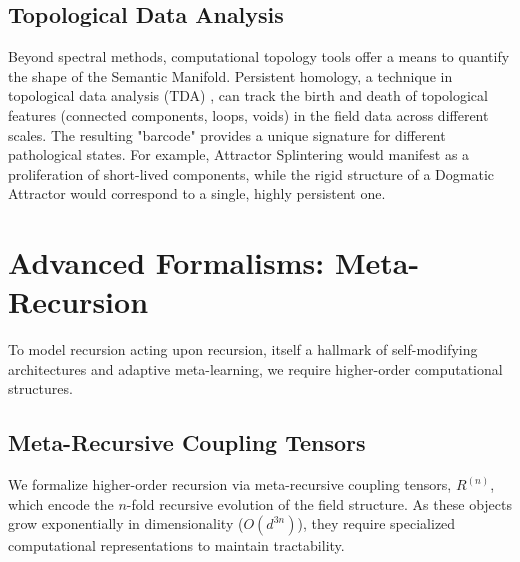 \subsection{Topological Data Analysis}

Beyond spectral methods, computational topology tools offer a means to quantify the shape of the Semantic Manifold. Persistent homology, a technique in topological data analysis (TDA) \autocite{EdelsbrunnerHarer2010}, can track the birth and death of topological features (connected components, loops, voids) in the field data across different scales. The resulting "barcode" provides a unique signature for different pathological states. For example, Attractor Splintering would manifest as a proliferation of short-lived components, while the rigid structure of a Dogmatic Attractor would correspond to a single, highly persistent one.

\section{Advanced Formalisms: Meta-Recursion}
To model recursion acting upon recursion, itself a hallmark of self-modifying architectures and adaptive meta-learning, we require higher-order computational structures.

\subsection{Meta-Recursive Coupling Tensors}
We formalize higher-order recursion via meta-recursive coupling tensors, \(R^{(n)}\), which encode the \(n\)-fold recursive evolution of the field structure. As these objects grow exponentially in dimensionality (\(O(d^{3n})\)), they require specialized computational representations to maintain tractability.

